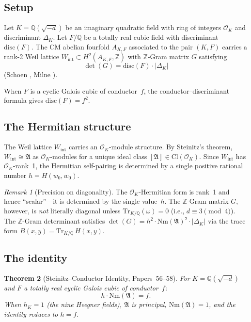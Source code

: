 \documentclass[11pt]{article}
\theoremstyle{plain}
\newtheorem{theorem}{Theorem}[section]
\theoremstyle{definition}
\theoremstyle{remark}
\newtheorem{remark}[theorem]{Remark}
\newcommand{\Z}{\mathbb{Z}}
\newcommand{\Q}{\mathbb{Q}}
\newcommand{\calO}{\mathcal{O}}
\newcommand{\fA}{\mathfrak{A}}
\newcommand{\Nm}{\mathrm{Nm}}
\newcommand{\Tr}{\mathrm{Tr}}
\newcommand{\disc}{\mathrm{disc}}
\newcommand{\Cl}{\mathrm{Cl}}
\begin{document}
\subsection{Setup}

Let $K = \Q(\sqrt{-d})$ be an imaginary quadratic field with ring
of integers $\calO_K$ and discriminant $\Delta_K$.  Let $F/\Q$ be
a totally real cubic field with discriminant $\disc(F)$.  The CM
abelian fourfold $A_{K,F}$ associated to the pair $(K, F)$ carries
a rank-2 Weil lattice $W_{\mathrm{int}} \subset H^2(A_{K,F}, \Z)$
with $\Z$-Gram matrix $G$ satisfying
\begin{equation}\label{eq:det}
  \det(G) = \disc(F) \cdot |\Delta_K|
\end{equation}
(Schoen \cite{Schoen1998}, Milne \cite{Milne1999}).

When $F$ is a cyclic Galois cubic of conductor~$f$, the
conductor--discriminant formula gives $\disc(F) = f^2$.

\subsection{The Hermitian structure}

The Weil lattice $W_{\mathrm{int}}$ carries an $\calO_K$-module
structure.  By Steinitz's theorem, $W_{\mathrm{int}} \cong \fA$
as $\calO_K$-modules for a unique ideal class
$[\fA] \in \Cl(\calO_K)$.  Since $W_{\mathrm{int}}$ has
$\calO_K$-rank~1, the Hermitian self-pairing is determined by a
single positive rational number $h = H(w_0, w_0)$.

\begin{remark}[Precision on diagonality]\label{rem:diagonal}
The $\calO_K$-Hermitian form is rank~1 and hence ``scalar''---it
is determined by the single value~$h$.  The $\Z$-Gram matrix
$G$, however, is \emph{not} literally diagonal unless
$\Tr_{K/\Q}(\omega) = 0$ (i.e., $d \equiv 3 \pmod{4}$).  The
$\Z$-Gram determinant satisfies
$\det(G) = h^2 \cdot \Nm(\fA)^2 \cdot |\Delta_K|$ via the
trace form $B(x,y) = \Tr_{K/\Q}\, H(x,y)$.
\end{remark}

\subsection{The identity}

\begin{theorem}[Steinitz--Conductor Identity,
  Papers~56--58]\label{thm:hf}
For $K = \Q(\sqrt{-d})$ and $F$ a totally real cyclic Galois
cubic of conductor~$f$:
\begin{equation}\label{eq:steinitz}
  h \cdot \Nm(\fA) = f.
\end{equation}
When $h_K = 1$ (the nine Heegner fields), $\fA$ is principal,
$\Nm(\fA) = 1$, and the identity reduces to $h = f$.
\end{theorem}
\end{document}
